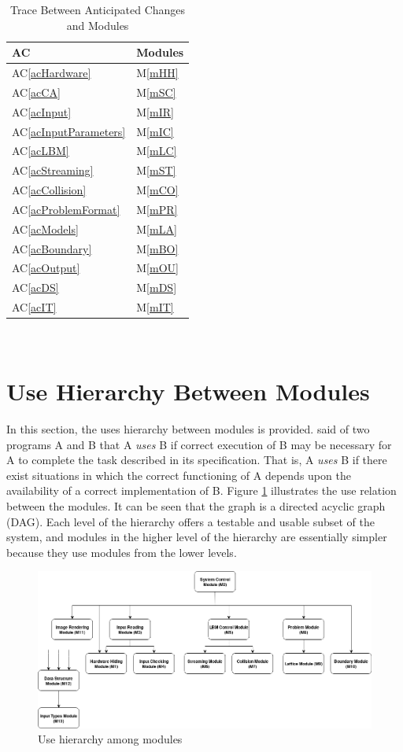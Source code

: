 \documentclass[12pt, titlepage]{article}
\newcommand{\acref}[1]{AC\ref{#1}}
\newcommand{\mref}[1]{M\ref{#1}}
\begin{document}
\begin{table}[H]
\centering
\begin{tabular}{p{} p{}}
\toprule
\textbf{AC} & \textbf{Modules}\\
\midrule
\acref{acHardware} & \mref{mHH}\\
\acref{acCA} & \mref{mSC}\\
\acref{acInput} & \mref{mIR}\\
\acref{acInputParameters} & \mref{mIC}\\
\acref{acLBM} & \mref{mLC}\\
\acref{acStreaming} & \mref{mST}\\
\acref{acCollision} & \mref{mCO}\\
\acref{acProblemFormat} & \mref{mPR}\\
\acref{acModels} & \mref{mLA}\\
\acref{acBoundary} & \mref{mBO}\\
\acref{acOutput} & \mref{mOU}\\
\acref{acDS} & \mref{mDS}\\
\acref{acIT} & \mref{mIT}\\
\bottomrule
\end{tabular}
\caption{Trace Between Anticipated Changes and Modules}
\label{TblACT}
\end{table}

~\newpage

\section{Use Hierarchy Between Modules} \label{SecUse}

In this section, the uses hierarchy between modules is
provided. \citet{Parnas1978} said of two programs A and B that A {\em uses} B if
correct execution of B may be necessary for A to complete the task described in
its specification. That is, A {\em uses} B if there exist situations in which
the correct functioning of A depends upon the availability of a correct
implementation of B.  Figure \ref{FigUH} illustrates the use relation between
the modules. It can be seen that the graph is a directed acyclic graph
(DAG). Each level of the hierarchy offers a testable and usable subset of the
system, and modules in the higher level of the hierarchy are essentially simpler
because they use modules from the lower levels.

\begin{figure}[H]
\centering
\includegraphics[width=1.0\textwidth]{DAG_CAS741}
\caption{Use hierarchy among modules}
\label{FigUH}
\end{figure}
\end{document}
